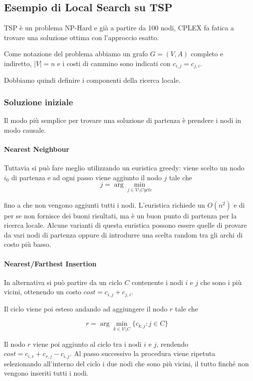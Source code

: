 \subsection{Esempio di Local Search su TSP}

TSP è un problema NP-Hard e già a partire da 100 nodi, CPLEX fa fatica a trovare una soluzione ottima con l'approccio esatto.

Come notazione del problema abbiamo un grafo $G = (V,A)$ completo e indiretto, $|V| = n$ e i costi di cammino sono indicati con $c_{i,j} = c_{j,i}$.

Dobbiamo quindi definire i componenti della ricerca locale.

\subsubsection{Soluzione iniziale}

Il modo più semplice per trovare una soluzione di partenza è prendere i nodi in modo causale.

\paragraph{Nearest Neighbour} Tuttavia si può fare meglio utilizzando un euristica greedy: viene scelto un nodo $i_0$ di partenza e ad ogni passo viene aggiunto il nodo $j$ tale che 
$$
j = \arg\min_{j\in V \setminus Cycle }
$$

\noindent fino a che non vengono aggiunti tutti i nodi.
L'euristica richiede un $O(n^2)$ e di per se non fornisce dei buoni risultati, ma è un buon punto di partenza per la ricerca locale.
Alcune varianti di questa euristica possono essere quelle di provare da vari nodi di partenza oppure di introdurre una scelta random tra gli archi di costo più basso.

\paragraph{Nearest/Farthest Insertion} 

In alternativa si può partire da un ciclo $C$ contenente i nodi $i$ e $j$ che sono i più vicini, ottenendo un costo $cost = c_{i,j} + c_{j,i}$. 

Il ciclo viene poi esteso andando ad aggiungere il nodo $r$ tale che

$$
r = \arg\min_{k \in V\setminus C} \{c_{k,j} : j \in C\}
$$

\noindent Il nodo $r$ viene poi aggiunto al ciclo tra i nodi $i$ e $j$, rendendo $cost = c_{i,r} + c_{r,j} - c_{i,j}$. 
Al passo successivo la procedura viene ripetuta selezionando all'interno del ciclo i due nodi che sono più vicini, il tutto finché non vengono inseriti tutti i nodi.

